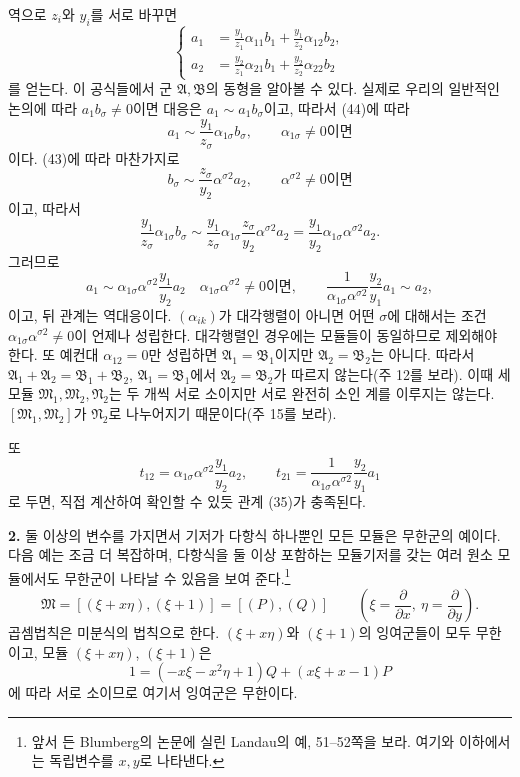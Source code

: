 역으로 \(z_i\)와 \(y_i\)를 서로 바꾸면
\begin{equation}
\left\{
\begin{aligned}
 a_1&=\frac{y_1}{z_1}\alpha_{11}b_1
     +\frac{y_1}{z_2}\alpha_{12}b_2,\\
 a_2&=\frac{y_2}{z_1}\alpha_{21}b_1
     +\frac{y_2}{z_2}\alpha_{22}b_2
\end{aligned}\right.
\tag{44}
\end{equation}
를 얻는다. 이 공식들에서 군 \(\mathfrak A,\mathfrak B\)의 동형을 알아볼 수 있다. 실제로 우리의 일반적인 논의에 따라 \(a_1b_\sigma\ne0\)이면 대응은 \(a_1\sim a_1b_\sigma\)이고, 따라서 (44)에 따라
\[
 a_1\sim\frac{y_1}{z_\sigma}\alpha_{1\sigma}b_\sigma,
 \qquad\text{\(\alpha_{1\sigma}\ne0\)이면}
\]
이다. (43)에 따라 마찬가지로
\[
 b_\sigma\sim\frac{z_\sigma}{y_2}\alpha^{\sigma2}a_2,
 \qquad\text{\(\alpha^{\sigma2}\ne0\)이면}
\]
이고, 따라서
\[
 \frac{y_1}{z_\sigma}\alpha_{1\sigma}b_\sigma
 \sim
 \frac{y_1}{z_\sigma}\alpha_{1\sigma}
 \frac{z_\sigma}{y_2}\alpha^{\sigma2}a_2
 =\frac{y_1}{y_2}\alpha_{1\sigma}\alpha^{\sigma2}a_2.
\]
그러므로
\[
 a_1\sim\alpha_{1\sigma}\alpha^{\sigma2}\frac{y_1}{y_2}a_2
 \quad\text{\(\alpha_{1\sigma}\alpha^{\sigma2}\ne0\)이면},
 \qquad
 \frac{1}{\alpha_{1\sigma}\alpha^{\sigma2}}
 \frac{y_2}{y_1}a_1\sim a_2,
\]
이고, 뒤 관계는 역대응이다. \((\alpha_{ik})\)가 대각행렬이 아니면 어떤 \(\sigma\)에 대해서는 조건 \(\alpha_{1\sigma}\alpha^{\sigma2}\ne0\)이 언제나 성립한다. 대각행렬인 경우에는 모듈들이 동일하므로 제외해야 한다. 또 예컨대 \(\alpha_{12}=0\)만 성립하면 \(\mathfrak A_1=\mathfrak B_1\)이지만 \(\mathfrak A_2=\mathfrak B_2\)는 아니다. 따라서 \(\mathfrak A_1+\mathfrak A_2=\mathfrak B_1+\mathfrak B_2\), \(\mathfrak A_1=\mathfrak B_1\)에서 \(\mathfrak A_2=\mathfrak B_2\)가 따르지 않는다(주 12를 보라). 이때 세 모듈 \(\mathfrak M_1,\mathfrak M_2,\mathfrak N_2\)는 두 개씩 서로 소이지만 서로 완전히 소인 계를 이루지는 않는다. \([\mathfrak M_1,\mathfrak M_2]\)가 \(\mathfrak N_2\)로 나누어지기 때문이다(주 15를 보라).

또
\[
 t_{12}=\alpha_{1\sigma}\alpha^{\sigma2}\frac{y_1}{y_2}a_2,
 \qquad
 t_{21}=\frac{1}{\alpha_{1\sigma}\alpha^{\sigma2}}
 \frac{y_2}{y_1}a_1
\]
로 두면, 직접 계산하여 확인할 수 있듯 관계 (35)가 충족된다.

\textbf{2.} 둘 이상의 변수를 가지면서 기저가 다항식 하나뿐인 모든 모듈은 무한군의 예이다. 다음 예는 조금 더 복잡하며, 다항식을 둘 이상 포함하는 모듈기저를 갖는 여러 원소 모듈에서도 무한군이 나타날 수 있음을 보여 준다.\footnote{앞서 든 Blumberg의 논문에 실린 Landau의 예, 51--52쪽을 보라. 여기와 이하에서는 독립변수를 \(x,y\)로 나타낸다.}
\[
 \mathfrak M=[(\xi+x\eta),(\xi+1)]=[(P),(Q)]
 \qquad\left(\xi=\frac{\partial}{\partial x},
 \ \eta=\frac{\partial}{\partial y}\right).
\]
곱셈법칙은 미분식의 법칙으로 한다. \((\xi+x\eta)\)와 \((\xi+1)\)의 잉여군들이 모두 무한이고, 모듈 \((\xi+x\eta)\), \((\xi+1)\)은
\[
 1=(-x\xi-x^2\eta+1)Q+(x\xi+x-1)P
\]
에 따라 서로 소이므로 여기서 잉여군은 무한이다.

